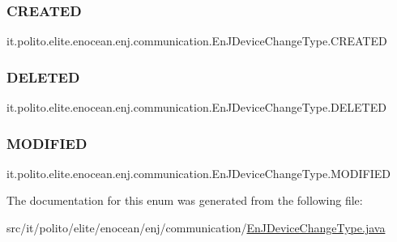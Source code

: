 \subsubsection{\texorpdfstring{C\+R\+E\+A\+T\+ED}{CREATED}}
{\footnotesize\ttfamily it.\+polito.\+elite.\+enocean.\+enj.\+communication.\+En\+J\+Device\+Change\+Type.\+C\+R\+E\+A\+T\+ED}

\hypertarget{enumit_1_1polito_1_1elite_1_1enocean_1_1enj_1_1communication_1_1_en_j_device_change_type_ae85f7cda6d72e93a1df185d3f814c49b}{}\label{enumit_1_1polito_1_1elite_1_1enocean_1_1enj_1_1communication_1_1_en_j_device_change_type_ae85f7cda6d72e93a1df185d3f814c49b} 
\subsubsection{\texorpdfstring{D\+E\+L\+E\+T\+ED}{DELETED}}
{\footnotesize\ttfamily it.\+polito.\+elite.\+enocean.\+enj.\+communication.\+En\+J\+Device\+Change\+Type.\+D\+E\+L\+E\+T\+ED}

\hypertarget{enumit_1_1polito_1_1elite_1_1enocean_1_1enj_1_1communication_1_1_en_j_device_change_type_aca5687c5e46e00a17c6807d47d19ae24}{}\label{enumit_1_1polito_1_1elite_1_1enocean_1_1enj_1_1communication_1_1_en_j_device_change_type_aca5687c5e46e00a17c6807d47d19ae24} 
\subsubsection{\texorpdfstring{M\+O\+D\+I\+F\+I\+ED}{MODIFIED}}
{\footnotesize\ttfamily it.\+polito.\+elite.\+enocean.\+enj.\+communication.\+En\+J\+Device\+Change\+Type.\+M\+O\+D\+I\+F\+I\+ED}



The documentation for this enum was generated from the following file\+:\begin{DoxyCompactItemize}
\item 
src/it/polito/elite/enocean/enj/communication/\hyperlink{_en_j_device_change_type_8java}{En\+J\+Device\+Change\+Type.\+java}\end{DoxyCompactItemize}
